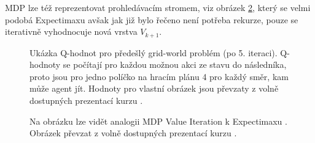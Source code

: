 MDP lze též reprezentovat prohledávacím stromem, viz obrázek \ref{img:mdptree}, který se velmi podobá Expectimaxu avšak jak již bylo řečeno není potřeba rekurze, pouze se iterativně vyhodnocuje nová vrstva $V_{k+1}$.
\newpage

\begin{figure}[ht]
\begin{center}
  \caption{Ukázka Q-hodnot pro předešlý grid-world problém (po 5. iteraci). Q-hodnoty se počítají pro každou možnou akci ze stavu do následníka, proto jsou pro jedno políčko na hracím plánu 4 pro každý směr, kam může agent jít. Hodnoty pro vlastní obrázek jsou převzaty z volně dostupných prezentací kurzu \cite{berkeley}.}
  \label{img:qvals}
\end{center}
\end{figure}

\begin{figure}[ht]
\begin{center}
  \caption{Na obrázku lze vidět analogii MDP Value Iteration k Expectimaxu \cite{RLIntro}. Obrázek převzat z volně dostupných prezentací kurzu \cite{berkeley}.}
  \label{img:mdptree}
\end{center}
\end{figure}
\newpage
